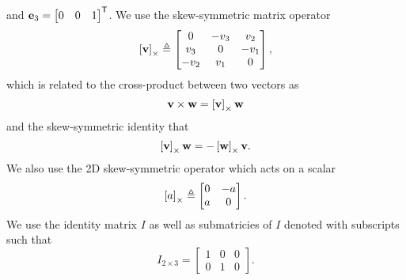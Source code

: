 and $\boldsymbol{\mathrm{e}}_3 = \begin{bmatrix} 0 & 0 & 1 \end{bmatrix}^{\mathsf{T}}$.
We use the skew-symmetric matrix operator
\begin{equation}
  \left[ \boldsymbol{\mathrm{v}} \right]_{\times} \triangleq
  \begin{bmatrix}
  0 & -v_{3} & v_{2}\\
  v_{3} & 0 & -v_{1}\\
  -v_{2} & v_{1} & 0
  \end{bmatrix},
\end{equation}
which is related to the cross-product between two vectors as
\begin{equation}
  \boldsymbol{\mathrm{v}}\times\boldsymbol{\mathrm{w}}=\left[ \boldsymbol{\mathrm{v}} \right]_{\times}\boldsymbol{\mathrm{w}}
\end{equation}
and the skew-symmetric identity that
\begin{equation}
  \left[ \boldsymbol{\mathrm{v}} \right]_{\times} \boldsymbol{\mathrm{w}} = -\left[ \boldsymbol{\mathrm{w}} \right]_{\times} \boldsymbol{\mathrm{v}}.
\end{equation}
We also use the 2D skew-symmetric operator which acts on a scalar
\begin{equation}
  \left[ a \right]_{\times} \triangleq
  \begin{bmatrix}
  0 & -a \\
  a & 0
  \end{bmatrix}.
\end{equation}
We use the identity matrix $I$ as well as submatricies of $I$ denoted with
subscripts such that
\begin{equation}
  I_{2 \times 3} =
  \begin{bmatrix}
    1 & 0 & 0 \\
    0 & 1 & 0
  \end{bmatrix}.
\end{equation}
